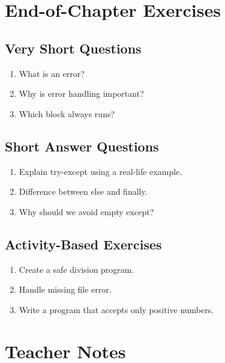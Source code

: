 \section{End-of-Chapter Exercises}

\subsection{Very Short Questions}

\begin{enumerate}
    \item What is an error?
    \item Why is error handling important?
    \item Which block always runs?
\end{enumerate}

\subsection{Short Answer Questions}

\begin{enumerate}
    \item Explain try-except using a real-life example.
    \item Difference between else and finally.
    \item Why should we avoid empty except?
\end{enumerate}

\subsection{Activity-Based Exercises}

\begin{enumerate}
    \item Create a safe division program.
    \item Handle missing file error.
    \item Write a program that accepts only positive numbers.
\end{enumerate}

\section{Teacher Notes}

